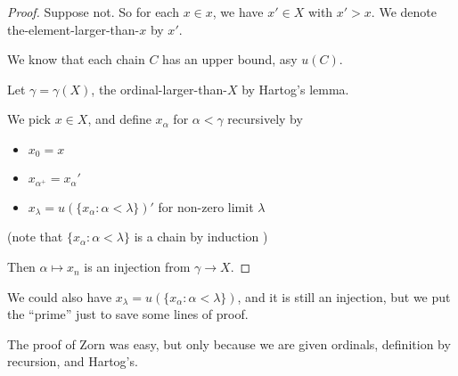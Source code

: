 \documentclass[a4paper]{article}
\begin{document}
\begin{proof}
  Suppose not. So for each $x\in x$, we have $x'\in X$ with $x' > x$. We denote the-element-larger-than-$x$ by $x'$.

  We know that each chain $C$ has an upper bound, asy $u(C)$.

  Let $\gamma = \gamma(X)$, the ordinal-larger-than-$X$ by Hartog's lemma.

  We pick $x\in X$, and define $x_\alpha$ for $\alpha < \gamma$ recursively by
  \begin{itemize}
    \item $x_0 = x$
    \item $x_{\alpha^+} = x_\alpha'$
    \item $x_{\lambda} = u(\{x_\alpha: \alpha < \lambda\})'$ for non-zero limit $\lambda$
  \end{itemize}
  (note that $\{x_\alpha: \alpha < \lambda\}$ is a chain by induction )

  Then $\alpha \mapsto x_n$ is an injection from $\gamma\to X$.
\end{proof}
\note We could also have $x_\lambda = u(\{x_\alpha : \alpha < \lambda\})$, and it is still an injection, but we put the ``prime'' just to save some lines of proof.

\note The proof of Zorn was easy, but only because we are given ordinals, definition by recursion, and Hartog's.
\end{document}

